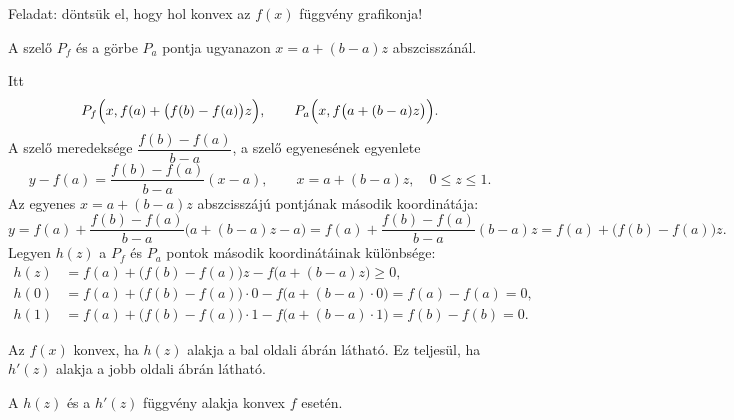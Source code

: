 \documentclass[11pt]{article}
\begin{document}
\noindent Feladat: döntsük el, hogy hol konvex az $f(x)$ függvény grafikonja!

\begin{notefig}{A szelő $P_{f}$ és a görbe $P_{a}$ pontja ugyanazon $x=a+(b-a)z$ abszcisszánál.}
\end{notefig}

\noindent Itt
\[
P_{f}\Bigl(x, f(a)+\bigl(f(b)-f(a)\bigr)z\Bigr),\qquad P_{a}\Bigl(x, f\bigl(a+(b-a)z\bigr)\Bigr).
\]
A szelő meredeksége $\dfrac{f(b)-f(a)}{b-a}$, a szelő egyenesének egyenlete
\[
y-f(a)=\frac{f(b)-f(a)}{b-a}(x-a),\qquad x=a+(b-a)z,\quad 0\le z\le 1 .
\]
Az egyenes $x=a+(b-a)z$ abszcisszájú pontjának második koordinátája:
\[
y=f(a)+\frac{f(b)-f(a)}{b-a}\bigl(a+(b-a)z-a\bigr)=f(a)+\frac{f(b)-f(a)}{b-a}(b-a)z=f(a)+\bigl(f(b)-f(a)\bigr)z .
\]
Legyen $h(z)$ a $P_{f}$ és $P_{a}$ pontok második koordinátáinak különbsége:
\begin{align*}
h(z)&=f(a)+\bigl(f(b)-f(a)\bigr)z-f\bigl(a+(b-a)z\bigr)\ge 0,\\
h(0)&=f(a)+\bigl(f(b)-f(a)\bigr)\cdot 0-f\bigl(a+(b-a)\cdot 0\bigr)=f(a)-f(a)=0,\\
h(1)&=f(a)+\bigl(f(b)-f(a)\bigr)\cdot 1-f\bigl(a+(b-a)\cdot 1\bigr)=f(b)-f(b)=0 .
\end{align*}

\noindent Az $f(x)$ konvex, ha $h(z)$ alakja a bal oldali ábrán látható. Ez teljesül, ha $h'(z)$ alakja a jobb oldali ábrán látható.

\begin{notefig}{A $h(z)$ és a $h'(z)$ függvény alakja konvex $f$ esetén.}
\hspace{1.5em}
\end{notefig}
\end{document}

